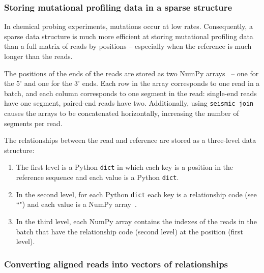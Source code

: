 \documentclass{article}
\begin{document}
\subsubsection{Storing mutational profiling data in a sparse structure}

In chemical probing experiments, mutations occur at low rates.
Consequently, a sparse data structure is much more efficient at storing mutational profiling data than a full matrix of reads by positions -- especially when the reference is much longer than the reads.

The positions of the ends of the reads are stored as two NumPy arrays~\cite{Harris2020} -- one for the 5' and one for the 3' ends.
Each row in the array corresponds to one read in a batch, and each column corresponds to one segment in the read: single-end reads have one segment, paired-end reads have two. 
Additionally, using \verb|seismic join| causes the arrays to be concatenated horizontally, increasing the number of segments per read.

The relationships between the read and reference are stored as a three-level data structure:
\begin{enumerate}
    \item The first level is a Python \verb|dict| in which each key is a position in the reference sequence and each value is a Python \verb|dict|.
    \item In the second level, for each Python \verb|dict| each key is a relationship code (see ``") and each value is a NumPy array~\cite{Harris2020}.
    \item In the third level, each NumPy array contains the indexes of the reads in the batch that have the relationship code (second level) at the position (first level).
\end{enumerate}

\subsubsection{Converting aligned reads into vectors of relationships}
\label{relationship-vector}
\end{document}
